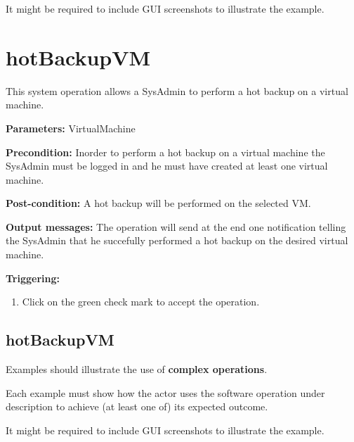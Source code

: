 It might be required to include GUI screenshots to illustrate the example.











\section{hotBackupVM}
\label{operation:hotBackupVM}
This system operation allows a SysAdmin to perform a hot backup on a virtual
machine.
\begin{description}

\item \textbf{Parameters:} VirtualMachine
\item \textbf{Precondition:} Inorder to perform a hot backup on a virtual
machine the SysAdmin must be logged in and he must have created at least one
virtual machine.
\item \textbf{Post-condition:} A hot backup will be performed on the selected
VM.
\item \textbf{Output messages:} The operation will send at the end one
notification telling the SysAdmin that he succefully performed a hot backup on
the desired virtual machine.

\item \textbf{Triggering:}
\begin{enumerate}
\item Click on the green check mark to accept the operation.
\end{enumerate}

 
\end{description}

 
\subsection{hotBackupVM}
Examples should illustrate the use of \textbf{complex operations}.

Each example must show how the actor uses the software operation under
description to achieve (at least one of) its expected outcome.

It might be required to include GUI screenshots to illustrate the example.








